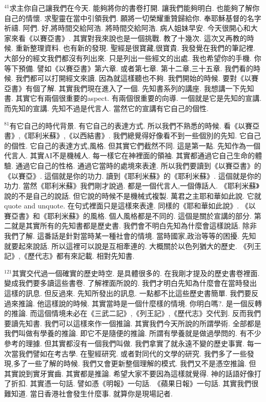 \documentclass{book}
\begin{document}
$^{41}$求主你自己讓我們在今天.
能夠將你的書卷打開.
讓我們能夠明白.
也能夠了解你自己的情懷.
求聖靈在當中引領我們.
願將一切榮耀重贊歸給你.
奉耶穌基督的名字祈禱.
阿們.
好,將時間交給阿浩.
將時間交給阿浩.
病人姐妹早安.
今天很開心和大家來看《以賽亞書》.
其實對我來說也是一個挑戰.
教了十幾次.
這次又再教的時候.
重新整理資料.
也有新的發現.
聖經是很寶藏,很寶貴.
我發覺在我們的筆記裡.
大部分的經文我們都沒有列出來.
只是列出一些經文的出處.
我也希望你的手機.
你等下預備.
譬如《以賽亞書》第六章.
或者第七章.
第十二章,三十五章.
我們看的時候.
我們都可以打開經文來讀.
因為就這樣聽也不夠.
我們開始的時候.
要對《以賽亞書》有個了解.
其實我們現在進入了一個.
先知書系列的講座.
我想講一下先知書.
其實它有兩個很重要的aspect.
有兩個很重要的向導.
一個就是它是先知的宣講.
而先知的宣講.
先知不過是代言人.
當然它的宣講有它自己的個性.

$^{81}$有它自己的時代背景.
有它自己的表達方式.
所以我們不熟悉的時候.
看《以賽亞書》,《耶利米蘇》,《以西結書》.
我們總覺得好像看不到一些個別的先知.
它自己的個性.
它自己的表達方式,風格.
但其實它們截然不同.
這是第一點.
先知作為一個代言人.
其實AI不是機械人.
每一樣它在神裡面的領袖.
其實都通過它自己生命的體驗.
通過它自己的性格.
通過它當時的處境來表達.
所以我們要讀到《以賽亞書》的《以賽亞》.
這個就是你的功力.
讀到《耶利米蘇》的《耶利米蘇》.
這個就是你的功力.
當然《耶利米蘇》我們剛才說過.
都是一個代言人,一個傳話人.
《耶利米蘇》說的不是自己的說話.
但它說的時候不是機械式複製.
萬君之主耶和華如此說.
它就quote and unquote.
在句式裡面只是這樣來表達.
同樣的《耶和華如此說》.
《以賽亞書》和《耶利米蘇》的風格.
個人風格都是不同的.
這個是關於宣講的部分.
第二就是其實所有的先知書都是歷史書.
我們會不明白先知為什麼會這樣說話.
除非我們了解.
這番話是針對當時某一種社會的情境.
當時國家,政治等等的困擾.
先知就要起來說話.
所以這裡可以說是互相牽連的.
大概關於以色列猶大的歷史.
《列王記》,《歷代志》都有來記載.
相對先知書.

$^{121}$其實交代過一個確實的歷史時空.
是具體很多的.
在我剛才提及的歷史書卷裡面.
變成我們要多讀這些書卷.
了解裡面所說的.
我們才明白先知為什麼會在當時發出這樣的訊息.
但反過來.
先知所發出的訊息.
一點都不比這些歷史書簡單.
我們要反過來推論.
他這樣說的時候.
其實當時是一個什麼樣的情境.
你明白嗎?.
是一個反轉的推論.
而這個情境未必在《三武二記》,《列王記》,《歷代志》交代到.
反而我們要讀先知書.
我們可以這樣來作一個推論.
其實我們今天所說的所謂學術.
全部都是我們叫做有學養的推論.
即它不是隨便的推論.
所謂有學養就是做過學問的.
有不少參考的理據.
但其實都沒有一個我們叫做.
我們拿實了就永遠不變的歷史事實.
每一次當我們譬如在考古學.
在聖經研究.
或者對同代的文學的研究.
我們多了一些發現,多了一些了解的時候.
我們又會更新整個理解的模式.
我們又不是憑空推論.
但其實說到實牙實齒.
其實都是推論.
希望大家不要因為這樣就覺得.
神的話語好像打了折扣.
其實憑一句話.
譬如憑《明報》一句話.
《蘋果日報》一句話.
其實我們很難知道.
當日香港社會發生什麼事.
就算你是現場記者.
\end{document}
